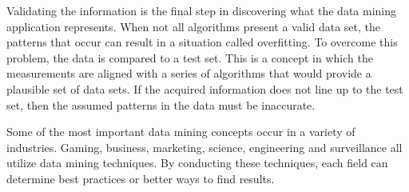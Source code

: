\documentclass[12pt]{article}
\begin{document}
Validating the information is the final step in discovering what the data mining application represents. When not all algorithms present a valid data set, the patterns that occur can result in a situation called overfitting. To overcome this problem, the data is compared to a test set. This is a concept in which the measurements are aligned with a series of algorithms that would provide a plausible set of data sets. If the acquired information does not line up to the test set, then the assumed patterns in the data must be inaccurate.



Some of the most important data mining concepts occur in a variety of industries. Gaming, business, marketing, science, engineering and surveillance all utilize data mining techniques. By conducting these techniques, each field can determine best practices or better ways to find results.
\end{document}
